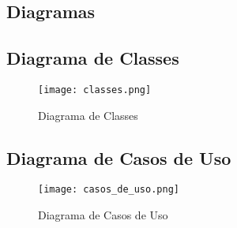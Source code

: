 \begin{landscape}
\section{Diagramas}\label{diagramas}

\subsection{Diagrama de Classes}
\begin{figure}[htb]
	\centering
	\texttt{[image: classes.png]}
	\caption{Diagrama de Classes}
\end{figure}

\clearpage

\subsection{Diagrama de Casos de Uso}
\begin{figure}[htb]
	\centering
	\texttt{[image: casos\_de\_uso.png]}
	\caption{Diagrama de Casos de Uso}
\end{figure}
\end{landscape}